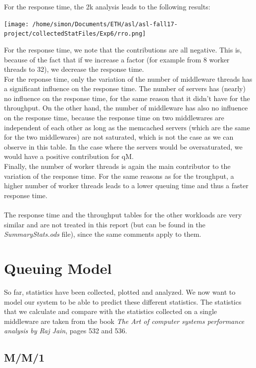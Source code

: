 \documentclass[11pt,a4paper]{article}
\begin{document}
For the response time, the 2k analysis leads to the following results:
\\
\begin{center} 
\texttt{[image: /home/simon/Documents/ETH/asl/asl-fall17-project/collectedStatFiles/Exp6/rro.png]}
\end{center} 
For the response time, we note that the contributions are all negative. This is, because of the fact that if we increase a factor (for example from 8 worker threads to 32), we decrease the response time. 
\\
For the reponse time, only the variation of the number of middleware threads has a significant influence on the response time. The number of servers has (nearly) no influence on the response time, for the same reason that it didn't have for the throughput. On the other hand, the number of middleware has also no influence on the response time, because the response time on two middlewares are independent of each other as long as the memcached servers (which are the same for the two middlewares) are not saturated, which is not the case as we can observe in this table. In the case where the servers would be oversaturated, we would have a positive contribution for qM. 
\\Finally, the number of worker threads is again the main contributor to the variation of the response time. For the same reasons as for the troughput, a higher number of worker threads leads to a lower queuing time and thus a faster response time. 
\\\\
The response time and the throughput tables for the other workloads are very similar and are not treated in this report (but can be found in the \textit{SummaryStats.ods} file), since the same comments apply to them. 
\newpage
\section{Queuing Model}
So far, statistics have been collected, plotted and analyzed. We now want to model our system to be able to predict these different statistics. The statistics that we calculate and compare with the statistics collected on a single middleware are taken from the book \textit{The Art of computer systems performance analysis by Raj Jain}, pages 532 and 536. 

\subsection{M/M/1}
\end{document}
